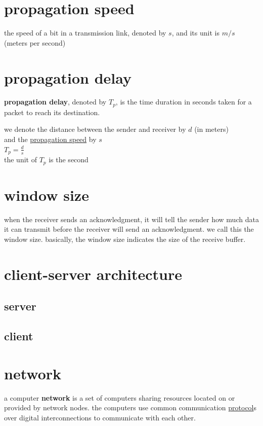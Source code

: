 \documentclass[a4paper,12pt]{article}
\begin{document}
\section{propagation speed}
\label{sec:org019b862}
the speed of a bit in a transmission link, denoted by \(s\), and its unit is \(m/s\) (meters per second)\\
\section{propagation delay}
\label{sec:org1724811}
\begin{definition}
\textbf{propagation delay}, denoted by \(T_p\), is the time duration in seconds taken for a packet to reach its destination.\\
\begin{lemma}
we denote the distance between the sender and receiver by \(d\) (in meters)\\
and the \hyperref[sec:org019b862]{propagation speed} by \(s\)\\
\(T_p = \frac{d}{s}\)\\
the unit of \(T_p\) is the second\\
\end{lemma}
\end{definition}
\section{window size}
\label{sec:org4920bcf}
when the receiver sends an acknowledgment, it will tell the sender how much data it can transmit before the receiver will send an acknowledgment. we call this the window size. basically, the window size indicates the size of the receive buffer.\\
\section{client-server architecture}
\label{sec:org489f272}
\subsection{server}
\label{sec:org3528d03}
\subsection{client}
\label{sec:org11c64de}
\section{network}
\label{sec:org9be7dda}
\begin{definition}
a computer \textbf{network} is a set of computers sharing resources located on or provided by network nodes. the computers use common communication \hyperref[sec:org040283e]{protocol}s over digital interconnections to communicate with each other.\\
\end{definition}
\end{document}
